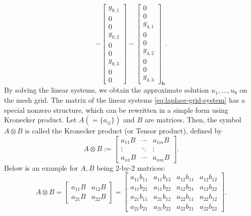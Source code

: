 \begin{equation}
{-\begin{bmatrix}g_{0,1}\\0\\0\\g_{0,2}\\0\\0\\g_{0,3}\\0\\0\end{bmatrix}
-\begin{bmatrix}0\\0\\g_{4,1}\\0\\0\\g_{4,2}\\0\\0\\g_{4,3}\end{bmatrix}}_{\boldsymbol{b}}.
\end{equation}
{By solving the linear systems, we obtain the approximate solution $u_1,\ldots,u_9$ on the mesh grid.}
{The matrix of the linear systems \eqref{eq:laplace-grid-system} has a special nonzero structure, which can be rewritten in a simple form using Kronecker product. Let $A(=\{a_{ij}\})$ and $B$ are matrices. Then, the symbol $A\otimes B$ is called the Kronecker product (or Tensor product), defined by}
\begin{equation}\label{eq:kronecker-product-definition}
A\otimes B:=\begin{bmatrix}a_{11}B&\cdots&a_{1m}B\\\vdots&\ddots&\vdots\\a_{n1}B&\cdots&a_{nm}B\end{bmatrix}.
\end{equation}
{Below is an example for $A,B$ being 2-by-2 matrices:}
\[A\otimes B=\left[\begin{array}{c|c}a_{11}B&a_{12}B\\\hline a_{21}B&a_{22}B\end{array}\right]
=\left[\begin{array}{cc|cc}
a_{11}b_{11}&a_{11}b_{12}&a_{12}b_{11}&a_{12}b_{12}\\
a_{11}b_{21}&a_{11}b_{22}&a_{12}b_{21}&a_{12}b_{22}\\\hline
a_{21}b_{11}&a_{21}b_{12}&a_{22}b_{11}&a_{22}b_{12}\\
a_{21}b_{21}&a_{21}b_{22}&a_{22}b_{21}&a_{22}b_{22}
\end{array}\right].\]

